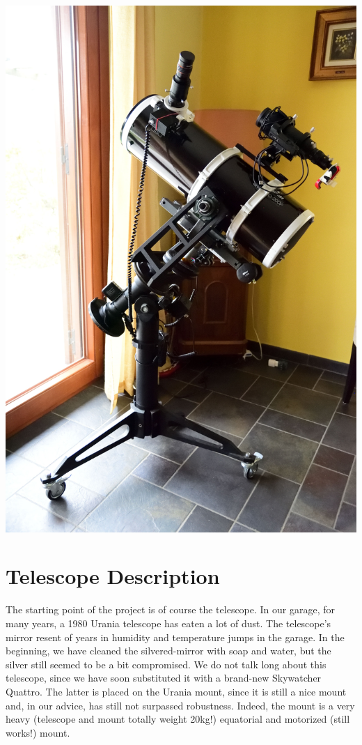 \documentclass{article}
\begin{document}
    \begin{multicols}{2}

        \tableofcontents

        \begin{minipage}{0.5\textwidth}
            \centering
            \includegraphics[scale=0.2]{DSC_5264_00001.jpg}
        \end{minipage}

        \section{Telescope Description}
        The starting point of the project is of course the telescope.
        In our garage, for many years, a 1980 Urania telescope has eaten a lot of dust.
        The telescope's mirror resent of years in humidity and temperature jumps in the garage.
        In the beginning, we have cleaned the silvered-mirror with soap and water, but the silver still seemed to be a bit compromised.
        We do not talk long about this telescope, since we have soon substituted it with a brand-new Skywatcher Quattro.
        The latter is placed on the Urania mount, since it is still a nice mount and, in our advice, has still not surpassed robustness.
        Indeed, the mount is a very heavy (telescope and mount totally weight 20kg!) equatorial and motorized (still works!) mount.
        

\end{multicols}
\end{document}
